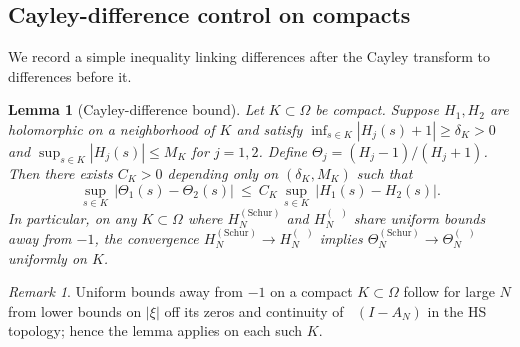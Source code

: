 \documentclass[11pt]{article}
\newtheorem{lemma}[theorem]{Lemma}
\theoremstyle{definition}
\theoremstyle{remark}
\newtheorem{remark}[theorem]{Remark}
\DeclareMathOperator{\dettwo}{det_2}
\begin{document}
\subsection{Cayley-difference control on compacts}\label{subsec:Cayley-difference}
We record a simple inequality linking differences after the Cayley transform to differences before it.

\begin{lemma}[Cayley-difference bound]\label{lem:Cayley-diff}
Let \(K\subset\Omega\) be compact. Suppose \(H_1,H_2\) are holomorphic on a neighborhood of \(K\) and satisfy \(\inf_{s\in K}|H_j(s)+1|\ge \delta_K>0\) and \(\sup_{s\in K}|H_j(s)|\le M_K\) for \(j=1,2\). Define \(\Theta_j=(H_j-1)/(H_j+1)\). Then there exists \(C_K>0\) depending only on \((\delta_K,M_K)\) such that
\[
 \sup_{s\in K}\,\big|\Theta_1(s)-\Theta_2(s)\big|\ \le\ C_K\,\sup_{s\in K}\,\big|H_1(s)-H_2(s)\big|.
\]
In particular, on any \(K\subset\Omega\) where \(H_N^{(\mathrm{Schur})}\) and \(H_N^{(\dettwo)}\) share uniform bounds away from \(-1\), the convergence \(H_N^{(\mathrm{Schur})}\to H_N^{(\dettwo)}\) implies \(\Theta_N^{(\mathrm{Schur})}\to \Theta_N^{(\dettwo)}\) uniformly on \(K\).
\end{lemma}
\begin{remark}
Uniform bounds away from \(-1\) on a compact \(K\subset\Omega\) follow for large \(N\) from lower bounds on \(|\xi|\) off its zeros and continuity of \(\dettwo(I-A_N)\) in the HS topology; hence the lemma applies on each such \(K\).
\end{remark}
\end{document}
